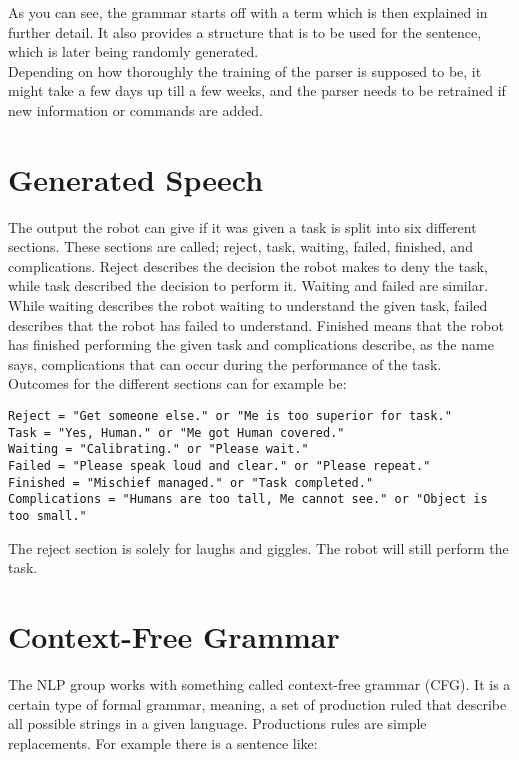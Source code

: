\documentclass[main.tex]{subfiles}
\begin{document}
	As you can see, the grammar starts off with a term which is then explained in further detail. It also provides a structure that is to be used for the sentence, which is later being randomly generated.\\ 
Depending on how thoroughly the training of the parser is supposed to be, it might take a few days up till a few weeks, and the parser needs to be retrained if new information or commands are added.

	\section{Generated Speech}
The output the robot can give if it was given a task is split into six different sections. These sections are called; reject, task, waiting, failed, finished, and complications. Reject describes the decision the robot makes to deny the task, while task described the decision to perform it. Waiting and failed are similar. While waiting describes the robot waiting to understand the 
given task, failed describes that the robot has failed to understand. Finished means that the robot has finished performing the given task and complications describe, as the name says, complications that can occur during the performance of the task.\\ 
Outcomes for the different sections can for example be:
		
\begin{verbatim}
Reject = "Get someone else." or "Me is too superior for task."
Task = "Yes, Human." or "Me got Human covered."
Waiting = "Calibrating." or "Please wait."
Failed = "Please speak loud and clear." or "Please repeat."
Finished = "Mischief managed." or "Task completed."
Complications = "Humans are too tall, Me cannot see." or "Object is too small."
\end{verbatim}
	
	The reject section is solely for laughs and giggles. The robot will still perform the task.
	
	\section{Context-Free Grammar}
	The NLP group works with something called context-free grammar (CFG). It is a certain type of formal grammar, meaning, a set of production ruled that describe all possible strings in a given language. Productions rules are simple replacements. For example there is a sentence like:
\end{document}
